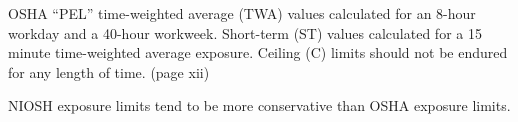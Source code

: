 \vskip 10pt

OSHA ``PEL'' time-weighted average (TWA) values calculated for an 8-hour workday and a 40-hour workweek.  Short-term (ST) values calculated for a 15 minute time-weighted average exposure.  Ceiling (C) limits should not be endured for any length of time.  (page xii)

\vskip 10pt

NIOSH exposure limits tend to be more conservative than OSHA exposure limits.




